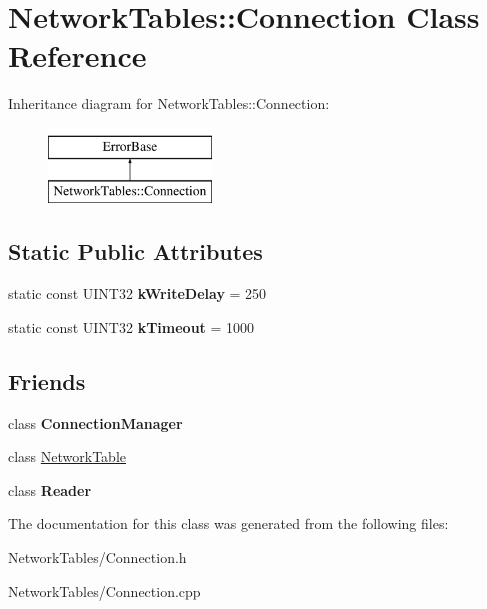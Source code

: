 \hypertarget{classNetworkTables_1_1Connection}{
\section{NetworkTables::Connection Class Reference}
\label{classNetworkTables_1_1Connection}
}
Inheritance diagram for NetworkTables::Connection:\begin{figure}[H]
\begin{center}
\leavevmode
\includegraphics[height=2.000000cm]{classNetworkTables_1_1Connection}
\end{center}
\end{figure}
\subsection*{Static Public Attributes}
\begin{DoxyCompactItemize}
\item 
\hypertarget{classNetworkTables_1_1Connection_a0ef89f92f4ab31da01e10ac0cf24908d}{
static const UINT32 {\bfseries kWriteDelay} = 250}
\label{classNetworkTables_1_1Connection_a0ef89f92f4ab31da01e10ac0cf24908d}

\item 
\hypertarget{classNetworkTables_1_1Connection_aad9901b1dc33ebdeb4f2d78bb50a568a}{
static const UINT32 {\bfseries kTimeout} = 1000}
\label{classNetworkTables_1_1Connection_aad9901b1dc33ebdeb4f2d78bb50a568a}

\end{DoxyCompactItemize}
\subsection*{Friends}
\begin{DoxyCompactItemize}
\item 
\hypertarget{classNetworkTables_1_1Connection_aaeb08ae6da3a23c3562ab2c1fcfa6a0a}{
class {\bfseries ConnectionManager}}
\label{classNetworkTables_1_1Connection_aaeb08ae6da3a23c3562ab2c1fcfa6a0a}

\item 
\hypertarget{classNetworkTables_1_1Connection_a3905c4951f43c6e488137ab3b23d9783}{
class \hyperlink{classNetworkTables_1_1Connection_a3905c4951f43c6e488137ab3b23d9783}{NetworkTable}}
\label{classNetworkTables_1_1Connection_a3905c4951f43c6e488137ab3b23d9783}

\item 
\hypertarget{classNetworkTables_1_1Connection_a35cb182752752c74a30050705acc3c06}{
class {\bfseries Reader}}
\label{classNetworkTables_1_1Connection_a35cb182752752c74a30050705acc3c06}

\end{DoxyCompactItemize}


The documentation for this class was generated from the following files:\begin{DoxyCompactItemize}
\item 
NetworkTables/Connection.h\item 
NetworkTables/Connection.cpp\end{DoxyCompactItemize}
